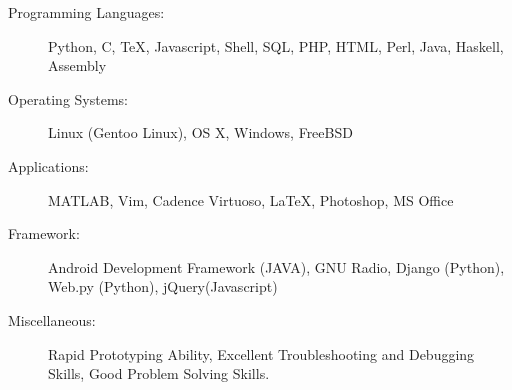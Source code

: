 \documentclass[a4paper, 11pt]{article}
\makeatletter
\newcommand{\ressection}[1]
{\fcolorbox{black}{shadecolor}{\vbox{\hsize 0.98\textwidth \textbf{\mbox{~}{\@ \large #1} \vphantom{p\^{E}}}}}}
\makeatother
\begin{document}
\begin{description}
\item[\@ \@  \@ \@ \@ \@  \@ \@ Programming Languages:]
Python, C,  {\texfont \TeX}, Javascript, Shell, SQL, PHP, HTML, Perl, Java, Haskell, Assembly
\item[\@ \@  \@ \@ \@ \@  \@ \@ Operating Systems:]
Linux (Gentoo Linux), OS X, Windows, FreeBSD
\item[\@ \@  \@ \@ \@ \@  \@ \@ Applications:]
MATLAB, Vim, Cadence Virtuoso, {\texfont \LaTeX}, Photoshop, MS Office
\item[\@ \@  \@ \@ \@ \@  \@ \@ Framework:]
Android Development Framework (JAVA), GNU Radio, Django (Python), Web.py (Python), jQuery(Javascript)
\item[\@ \@  \@ \@ \@ \@  \@ \@ Miscellaneous:]
Rapid Prototyping Ability, Excellent Troubleshooting and Debugging Skills, Good Problem Solving Skills. 
\end{description}



\end{document}
